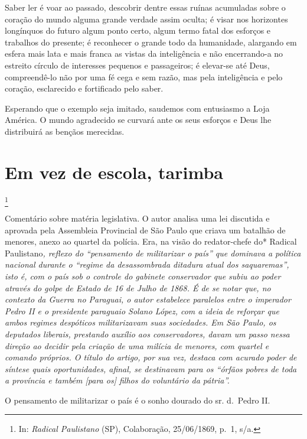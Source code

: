 Saber ler é voar ao passado, descobrir dentre essas ruínas acumuladas
sobre o coração do mundo alguma grande verdade assim oculta; é visar nos
horizontes longínquos do futuro algum ponto certo, algum termo fatal dos
esforços e trabalhos do presente; é reconhecer o grande todo da
humanidade, alargando em esfera mais lata e mais franca as vistas da
inteligência e não encerrando-a no estreito círculo de interesses
pequenos e passageiros; é elevar-se até Deus, compreendê-lo não por uma
fé cega e sem razão, mas pela inteligência e pelo coração, esclarecido e
fortificado pelo saber.

Esperando que o exemplo seja imitado, saudemos com entusiasmo a Loja
América. O mundo agradecido se curvará ante os seus esforços e Deus lhe
distribuirá as bençãos merecidas.

\chapter{Em vez de escola, tarimba}\footnote{In: \emph{Radical Paulistano}
  (SP), Colaboração, 25/06/1869, p.~1, s/a.}

\begin{didascalia}
Comentário sobre matéria legislativa. O autor analisa uma lei discutida
e aprovada pela Assembleia Provincial de São Paulo que criava um
batalhão de menores, anexo ao quartel da polícia. Era, na visão do
redator-chefe do* Radical Paulistano\emph{, reflexo do ``pensamento de
militarizar o país'' que dominava a política nacional durante o ``regime
da desassombrada ditadura atual dos saquaremas'', isto é, com o país sob
o controle do gabinete conservador que subiu ao poder através do golpe
de Estado de 16 de Julho de 1868. É de se notar que, no contexto da
Guerra no Paraguai, o autor estabelece paralelos entre o imperador Pedro
II e o presidente paraguaio Solano López, com a ideia de reforçar que
ambos regimes despóticos militarizavam suas sociedades. Em São Paulo, os
deputados liberais, prestando auxílio aos conservadores, davam um passo
nessa direção ao decidir pela criação de uma milícia de menores, com
quartel e comando próprios. O título do artigo, por sua vez, destaca com
acurado poder de síntese quais oportunidades, afinal, se destinavam para
os ``órfãos pobres de toda a província e também {[}para os{]} filhos do
voluntário da pátria''.}
\end{didascalia}

\asterisc{}

O pensamento de militarizar o país é o sonho dourado do sr. d.~Pedro II.

